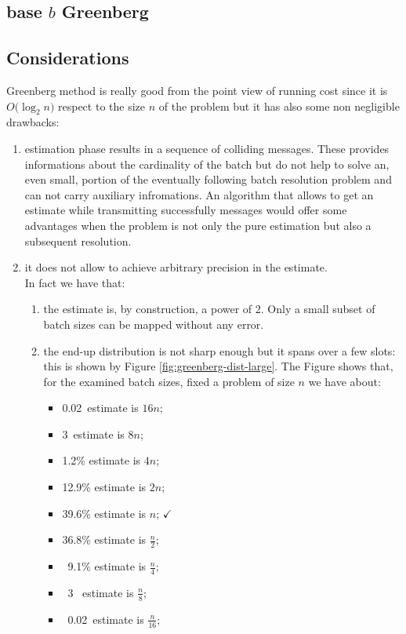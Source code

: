 \documentclass[12pt,a4paper]{report}
\begin{document}
\subsection{base $b$ Greenberg}
\subsection{Considerations}
Greenberg method is really good from the point view of running cost since it is $O\bigl(\log_{2}n\bigr)$ respect to the size  $n$ of the problem but it has also some non negligible drawbacks:
\begin{enumerate}[\bf a)]
\item estimation phase results in a sequence of colliding messages. These provides informations about the cardinality of the batch but do not help to solve an, even small, portion of the eventually following batch resolution problem and can not carry auxiliary infromations. An algorithm that allows to get an estimate while transmitting successfully messages would offer some advantages when the problem is not only the pure estimation but also a subsequent resolution.
\item it does not allow to achieve arbitrary precision in the estimate.\\ In fact we have that:
	\begin{enumerate}[\it i.]
		\item  the estimate is, by construction, a power of 2. Only a small subset of batch sizes can be mapped without any error.
		\item the end-up distribution is not sharp enough but it spans over a few slots: this is shown by Figure \ref{fig:greenberg-dist-large}. The Figure shows that, for the examined batch sizes, fixed a problem of size $n$ we have about:
		\begin{itemize}
		\item 0.02\textpertenthousand\  estimate is $16n$;
		\item 3\textpertenthousand\  estimate is $8n$;
		\item 1.2\% estimate is $4n$;
		\item 12.9\% estimate is $2n$;
		\item 39.6\% estimate is $n$; $\checkmark$
		\item 36.8\% estimate is $\frac{n}{2}$;
		\item \ 9.1\% estimate is $\frac{n}{4}$;
		\item \  3 \textperthousand\ estimate is $\frac{n}{8}$;
		\item \ 0.02\textpertenthousand\ estimate is $\frac{n}{16}$;

\end{itemize}
\end{enumerate}
\end{enumerate}
\end{document}
